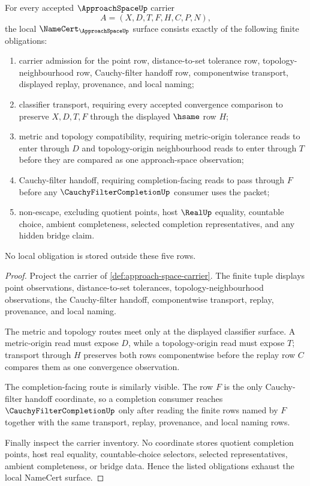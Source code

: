 \begin{theorem}
\label{thm:approach-space-namecert-obligations}
For every accepted $\ApproachSpaceUp$ carrier
$$
A=(X,D,T,F,H,C,P,N),
$$
the local $\NameCert_{\ApproachSpaceUp}$ surface consists exactly of the following finite obligations:
\begin{enumerate}
\item carrier admission for the point row, distance-to-set tolerance row, topology-neighbourhood row, Cauchy-filter handoff row, componentwise transport, displayed replay, provenance, and local naming;
\item classifier transport, requiring every accepted convergence comparison to preserve $X,D,T,F$ through the displayed $\hsame$ row $H$;
\item metric and topology compatibility, requiring metric-origin tolerance reads to enter through $D$ and topology-origin neighbourhood reads to enter through $T$ before they are compared as one approach-space observation;
\item Cauchy-filter handoff, requiring completion-facing reads to pass through $F$ before any $\CauchyFilterCompletionUp$ consumer uses the packet;
\item non-escape, excluding quotient points, host $\RealUp$ equality, countable choice, ambient completeness, selected completion representatives, and any hidden bridge claim.
\end{enumerate}
No local obligation is stored outside these five rows.
\end{theorem}
\begin{proof}
Project the carrier of \autoref{def:approach-space-carrier}. The finite tuple displays point observations, distance-to-set tolerances, topology-neighbourhood observations, the Cauchy-filter handoff, componentwise transport, replay, provenance, and local naming.

The metric and topology routes meet only at the displayed classifier surface. A metric-origin read must expose $D$, while a topology-origin read must expose $T$; transport through $H$ preserves both rows componentwise before the replay row $C$ compares them as one convergence observation.

The completion-facing route is similarly visible. The row $F$ is the only Cauchy-filter handoff coordinate, so a completion consumer reaches $\CauchyFilterCompletionUp$ only after reading the finite rows named by $F$ together with the same transport, replay, provenance, and local naming rows.

Finally inspect the carrier inventory. No coordinate stores quotient completion points, host real equality, countable-choice selectors, selected representatives, ambient completeness, or bridge data. Hence the listed obligations exhaust the local NameCert surface.
\end{proof}

